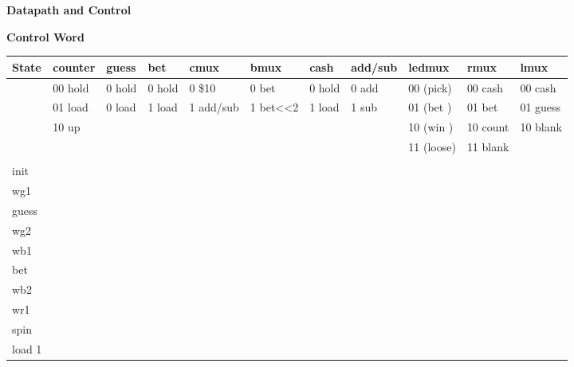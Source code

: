 \documentclass{article}[10 pt,landscape]
\begin{document}
\begin{landscape}
{\bf Datapath and Control}
\begin{figure}[ht]
\end{figure}

\pagebreak
{\bf Control Word}

{\normalsize
\begin{tabular}{l|l|l|l|l|l|l|l|l|l|l}
State &  counter& guess  & bet    & cmux      & bmux     & cash   & add/sub & ledmux    & rmux   & lmux \\ \hline
      & 00 hold & 0 hold & 0 hold & 0 \$10    & 0 bet    & 0 hold & 0 add  & 00 (pick) &00 cash &00 cash  \\ \hline
      & 01 load & 0 load & 1 load & 1 add/sub & 1 bet<<2 & 1 load & 1 sub  & 01 (bet ) &01 bet  &01 guess \\ \hline
      & 10 up   &        &        &  	      &          &        &        & 10 (win ) &10 count&10 blank \\ \hline
      &         &        &        &  	      &          &        &        & 11 (loose)&11 blank&         \\ \hline
      &         &        &        &  	      &          &        &        &          &         &   \\ \hline
init  &       &       &       & 	      &         &       &       &        &       & \\ \hline
wg1   &       &       &       & 	      &         &       &       &        &       & \\ \hline
guess &       &       &       & 	      &         &       &       &        &       & \\ \hline
wg2   &       &       &       & 	      &         &       &       &        &       & \\ \hline
wb1   &       &       &       & 	      &         &       &       &        &       & \\ \hline
bet   &       &       &       & 	      &         &       &       &        &       & \\ \hline
wb2   &       &       &       & 	      &         &       &       &        &       & \\ \hline
wr1   &       &       &       & 	      &         &       &       &        &       & \\ \hline
spin  &       &       &       & 	      &         &       &       &        &       & \\ \hline
load 1&       &       &       & 	      &         &       &       &        &       & \\ \hline

\end{tabular}}
\end{landscape}
\end{document}
